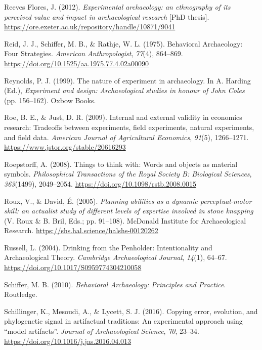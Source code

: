\documentclass[
  11pt,
  letterpaper,
  DIV=11,
  numbers=noendperiod]{scrartcl}
\newlength{\cslhangindent}
\newenvironment{CSLReferences}[2] %
 {\begin{list}{}{%
  \setlength{\itemindent}{0pt}
  \setlength{\leftmargin}{0pt}
  \setlength{\parsep}{0pt}
  \ifodd #1
   \setlength{\leftmargin}{\cslhangindent}
   \setlength{\itemindent}{-1\cslhangindent}
  \fi
  \setlength{\itemsep}{#2\baselineskip}}}
 {\end{list}}
\begin{document}
\begin{CSLReferences}{1}{0}
Reeves Flores, J. (2012). \emph{Experimental archaeology: an ethnography
of its perceived value and impact in archaeological research} {[}PhD
thesis{]}. \url{https://ore.exeter.ac.uk/repository/handle/10871/9041}

Reid, J. J., Schiffer, M. B., \& Rathje, W. L. (1975). Behavioral
Archaeology: Four Strategies. \emph{American Anthropologist},
\emph{77}(4), 864--869.
\url{https://doi.org/10.1525/aa.1975.77.4.02a00090}

Reynolds, P. J. (1999). The nature of experiment in archaeology. In A.
Harding (Ed.), \emph{Experiment and design: {Archaeological} studies in
honour of {John} {Coles}} (pp. 156--162). Oxbow Books.

Roe, B. E., \& Just, D. R. (2009). Internal and external validity in
economics research: Tradeoffs between experiments, field experiments,
natural experiments, and field data. \emph{American Journal of
Agricultural Economics}, \emph{91}(5), 1266--1271.
\url{https://www.jstor.org/stable/20616293}

Roepstorff, A. (2008). Things to think with: Words and objects as
material symbols. \emph{Philosophical Transactions of the Royal Society
B: Biological Sciences}, \emph{363}(1499), 2049--2054.
\url{https://doi.org/10.1098/rstb.2008.0015}

Roux, V., \& David, É. (2005). \emph{Planning abilities as a dynamic
perceptual-motor skill: an actualist study of different levels of
expertise involved in stone knapping} (V. Roux \& B. Bril, Eds.; pp.
91--108). McDonald Institute for Archaeological Research.
\url{https://shs.hal.science/halshs-00120262}

Russell, L. (2004). Drinking from the Penholder: Intentionality and
Archaeological Theory. \emph{Cambridge Archaeological Journal},
\emph{14}(1), 64--67. \url{https://doi.org/10.1017/S0959774304210058}

Schiffer, M. B. (2010). \emph{Behavioral Archaeology: Principles and
Practice}. Routledge.

Schillinger, K., Mesoudi, A., \& Lycett, S. J. (2016). Copying error,
evolution, and phylogenetic signal in artifactual traditions: An
experimental approach using {``}model artifacts{''}. \emph{Journal of
Archaeological Science}, \emph{70}, 23--34.
\url{https://doi.org/10.1016/j.jas.2016.04.013}


\end{CSLReferences}
\end{document}
